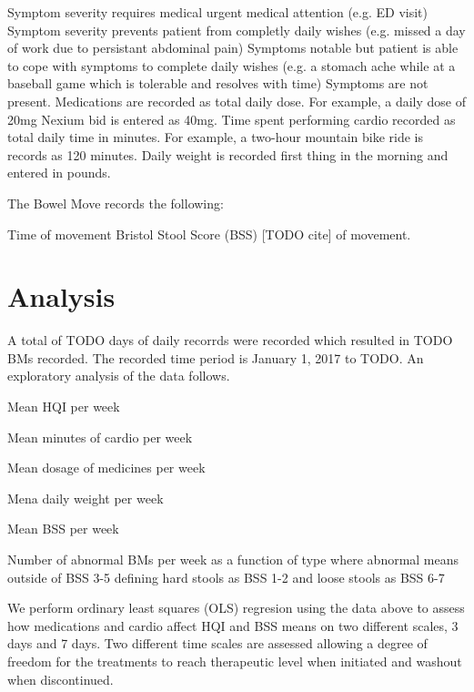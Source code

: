 \documentclass[conference]{IEEEtran}
\begin{document}
Symptom severity requires medical urgent medical attention (e.g. ED visit)
Symptom severity prevents patient from completly daily wishes (e.g. missed a day of work due to persistant abdominal pain)
Symptoms notable but patient is able to cope with symptoms to complete daily wishes (e.g. a stomach ache while at a baseball game which is tolerable and resolves with time)
Symptoms are not present.
Medications are recorded as total daily dose.  For example, a daily dose of 20mg Nexium bid is entered as 40mg. Time spent performing cardio recorded as total daily time in minutes.  For example, a two-hour mountain bike ride is records as 120 minutes. Daily weight is recorded first thing in the morning and entered in pounds.

The Bowel Move records the following:

Time of movement
Bristol Stool Score (BSS) [TODO cite] of movement.

\section{Analysis}

A total of TODO days of daily recorrds were recorded which resulted in TODO BMs recorded.  The recorded time period is January 1, 2017 to TODO.  An exploratory analysis of the data follows.

Mean HQI per week

Mean minutes of cardio per week

Mean dosage of medicines per week

Mena daily weight per week

Mean BSS per week

Number of abnormal BMs per week as a function of type where abnormal means outside of BSS 3-5 defining hard stools as BSS 1-2 and loose stools as BSS 6-7

We perform ordinary least squares (OLS) regresion using the data above to assess how medications and cardio affect HQI and BSS means on two different scales, 3 days and 7 days.  Two different time scales are assessed allowing a degree of freedom for the treatments to reach therapeutic level when initiated and washout when discontinued.
\end{document}
